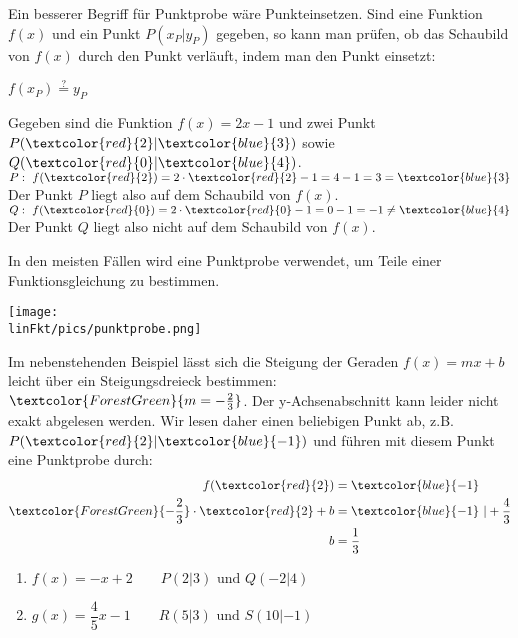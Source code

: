 Ein besserer Begriff für Punktprobe wäre Punkteinsetzen. Sind eine Funktion $f(x)$ und ein Punkt $P(x_P|y_P)$ gegeben, so kann man prüfen, ob das Schaubild von $f(x)$ durch den Punkt verläuft, indem man den Punkt einsetzt:
\begin{tcolorbox}
	\centering
	\textcolor{loestc}{$f(x_P)\overset{?}{=}y_P$}
\end{tcolorbox}
\begin{bsp}
	Gegeben sind die Funktion $f(x)=2x-1$ und zwei Punkt $P(\textcolor{red}{2}|\textcolor{blue}{3})$ sowie $Q(\textcolor{red}{0}|\textcolor{blue}{4})$.\\
	$P:\ f(\textcolor{red}{2})=2\cdot \textcolor{red}{2}-1=4-1=3=\textcolor{blue}{3}$\\
	Der Punkt $P$ liegt also auf dem Schaubild von $f(x)$.\\
	$Q:\ f(\textcolor{red}{0})=2\cdot \textcolor{red}{0}-1=0-1=-1\neq\textcolor{blue}{4}$\\
	Der Punkt $Q$ liegt also nicht auf dem Schaubild von $f(x)$.
\end{bsp}
In den meisten Fällen wird eine Punktprobe verwendet, um Teile einer Funktionsgleichung zu bestimmen.\vspace{0.5em}\\
\begin{minipage}{0.5\textwidth}
	\texttt{[image: \\linFkt/pics/punktprobe.png]}
\end{minipage}
\begin{minipage}{0.5\textwidth}
	Im nebenstehenden Beispiel lässt sich die Steigung der Geraden $f(x)=mx+b$ leicht über ein Steigungsdreieck bestimmen: $\textcolor{ForestGreen}{m=-\tfrac{2}{3}}$. Der y-Achsenabschnitt kann leider nicht exakt abgelesen werden. Wir lesen daher einen beliebigen Punkt ab, z.B. $P(\textcolor{red}{2}|\textcolor{blue}{-1})$ und führen mit diesem Punkt eine Punktprobe durch:
	\begin{align*}
		f(\textcolor{red}{2})&=\textcolor{blue}{-1}\\
		\textcolor{ForestGreen}{-\dfrac{2}{3}}\cdot\textcolor{red}{2}+b&=\textcolor{blue}{-1}\ \rvert+\dfrac{4}{3}\\
		b&=\dfrac{1}{3}
	\end{align*}

\end{minipage}
\begin{Exercise}[title={Prüfe, ob die Punkte auf dem Schaubild der Funktion liegen}, label=punktprobeA1]
	\begin{enumerate}[label=\alph*)]
		\item $f(x)=-x+2\qquad P(2|3)\text{ und }Q(-2|4)$
		\item $g(x)=\dfrac{4}{5}x-1\qquad R(5|3)\text{ und }S(10|-1)$
	\end{enumerate}
\end{Exercise}
